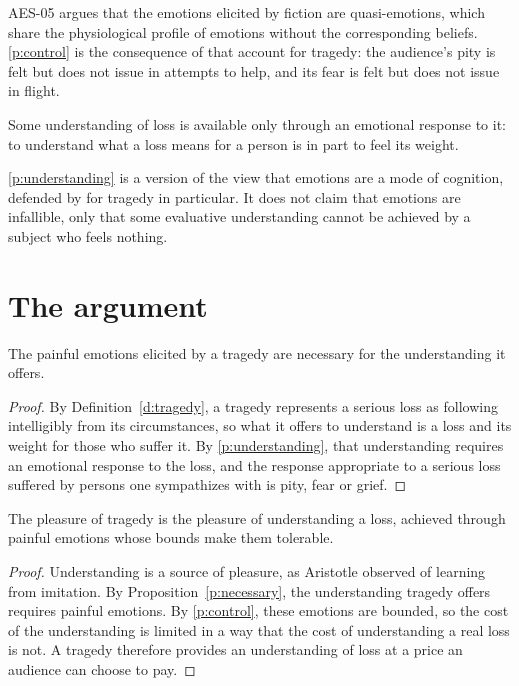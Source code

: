 \documentclass{situationist-preprint}
\begin{document}
AES-05 argues that the emotions elicited by fiction are quasi-emotions, which share the physiological profile of emotions without the corresponding beliefs. \ref{p:control} is the consequence of that account for tragedy: the audience's pity is felt but does not issue in attempts to help, and its fear is felt but does not issue in flight.

\begin{principle}\label{p:understanding}
Some understanding of loss is available only through an emotional response to it: to understand what a loss means for a person is in part to feel its weight.
\end{principle}

\ref{p:understanding} is a version of the view that emotions are a mode of cognition, defended by \citet{Nussbaum1986} for tragedy in particular. It does not claim that emotions are infallible, only that some evaluative understanding cannot be achieved by a subject who feels nothing.

\section{The argument}

\begin{proposition}\label{p:necessary}
The painful emotions elicited by a tragedy are necessary for the understanding it offers.
\end{proposition}

\begin{proof}
By Definition~\ref{d:tragedy}, a tragedy represents a serious loss as following intelligibly from its circumstances, so what it offers to understand is a loss and its weight for those who suffer it. By \ref{p:understanding}, that understanding requires an emotional response to the loss, and the response appropriate to a serious loss suffered by persons one sympathizes with is pity, fear or grief.
\end{proof}

\begin{theorem}\label{t:main}
The pleasure of tragedy is the pleasure of understanding a loss, achieved through painful emotions whose bounds make them tolerable.
\end{theorem}

\begin{proof}
Understanding is a source of pleasure, as Aristotle observed of learning from imitation. By Proposition~\ref{p:necessary}, the understanding tragedy offers requires painful emotions. By \ref{p:control}, these emotions are bounded, so the cost of the understanding is limited in a way that the cost of understanding a real loss is not. A tragedy therefore provides an understanding of loss at a price an audience can choose to pay.
\end{proof}
\end{document}
